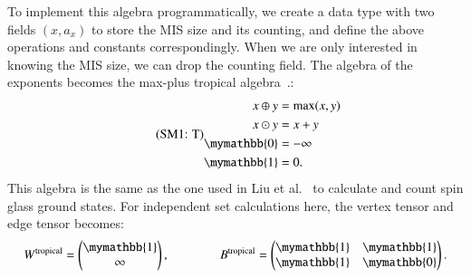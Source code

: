 \documentclass[onefignum, onetabnum]{siamart190516}
\newcommand{\eqname}[1]{\stepcounter{equation}\tag{\theequation : #1}}
\newcommand{\<}{\langle}
\renewcommand{\>}{\rangle}
\begin{document}
To implement this algebra programmatically, we create a data type with two fields $(x, a_x)$ to store the MIS size and its counting,
and define the above operations and constants correspondingly.
When we are only interested in knowing the MIS size, we can drop the counting field.
The algebra of the exponents becomes the max-plus tropical algebra~\cite{Maclagan2015, Moore2011}.:
\begin{equation}\eqname{T}
    \begin{split}
        x \oplus y &= \max(x,y)\\
        x \odot y &= x + y\\
        \mymathbb{0} &= -\infty\\
        \mymathbb{1} &= 0.
    \end{split}\label{eq:tropical}
\end{equation}
This algebra is the same as the one used in Liu et al.~\cite{Liu2021} to calculate and count spin glass ground states.
For independent set calculations here, the vertex tensor and edge tensor becomes:
\begin{equation}
    W^{\rm tropical} = \left(\begin{matrix}
        \mymathbb{1} \\
        \infty
    \end{matrix}\right),   
    \qquad \qquad
        B^{\rm tropical} = \left(\begin{matrix}
        \mymathbb{1}  & \mymathbb{1} \\
        \mymathbb{1} & \mymathbb{0}
    \end{matrix}\right).
\end{equation}
\end{document}
